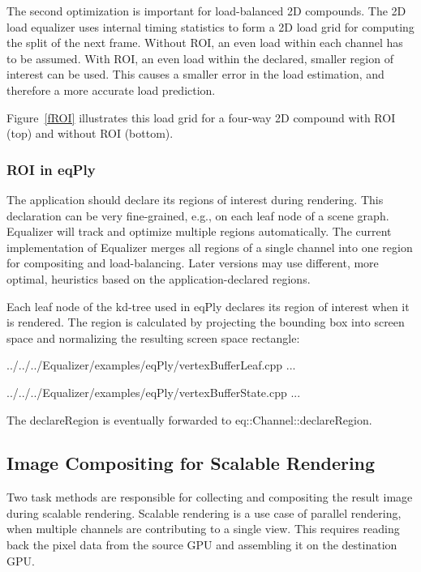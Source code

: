\documentclass[10pt,a4]{scrartcl}
\newcommand{\fig}[1]{Figure~\ref{#1}}
\begin{document}
The second optimization is important for load-balanced 2D compounds. The 2D
load equalizer uses internal timing statistics to form a 2D load grid for
computing the split of the next frame. Without ROI, an even load within each
channel has to be assumed. With ROI, an even load within the declared, smaller
region of interest can be used. This causes a smaller error in the load
estimation, and therefore a more accurate load prediction. 

\fig{fROI} illustrates this load grid for a four-way 2D compound with ROI (top)
and without ROI (bottom).

\subsubsection{ROI in eqPly}
The application should declare its regions of interest during rendering. This
declaration can be very fine-grained, e.g., on each leaf node of a scene
graph. Equalizer will track and optimize multiple regions automatically. The
current implementation of Equalizer merges all regions of a single channel into
one region for compositing and load-balancing. Later versions may use different,
more optimal, heuristics based on the application-declared regions.

Each leaf node of the kd-tree used in eqPly declares its region of interest when
it is rendered. The region is calculated by projecting the bounding box into
screen space and normalizing the resulting screen space rectangle:

{\footnotesize
  
                  {../../../Equalizer/examples/eqPly/vertexBufferLeaf.cpp}
                  ...
  
                  {../../../Equalizer/examples/eqPly/vertexBufferState.cpp}
                  ...
}

The \textsf{declareRegion} is eventually forwarded to
\textsf{eq::Channel::declareRegion}.


\subsection{\label{sCompositing}Image Compositing for Scalable Rendering}

Two task methods are responsible for collecting and compositing the
result image during scalable rendering. Scalable rendering is a use case
of parallel rendering, when multiple channels are contributing to a single
view. This requires reading back the pixel data from the source GPU and
assembling it on the destination GPU.
\end{document}
